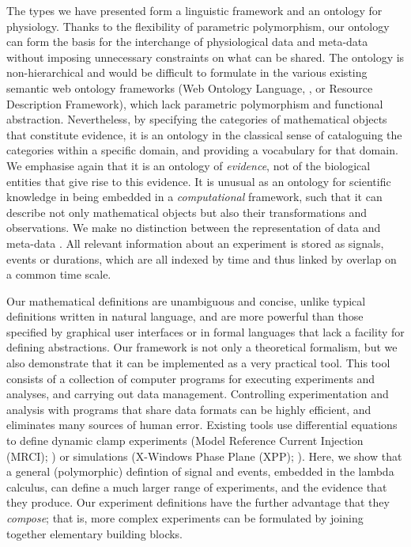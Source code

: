 \documentclass[11pt]{article}
\begin{document}
The types we have presented form a linguistic framework and an
ontology for physiology. Thanks to the flexibility of parametric
polymorphism, our ontology can form the basis for the interchange of
physiological data and meta-data without imposing unnecessary
constraints on what can be shared. The ontology is non-hierarchical
and would be difficult to formulate in the various existing semantic
web ontology frameworks (Web Ontology Language, \citep{owlref}, or
Resource Description Framework), which lack parametric polymorphism
and functional abstraction. Nevertheless, by specifying the categories
of mathematical objects that constitute evidence, it is an ontology in
the classical sense of cataloguing the categories within a specific
domain, and providing a vocabulary for that domain. We emphasise again
that it is an ontology of \emph{evidence}, not of the biological
entities that give rise to this evidence. It is unusual as an ontology
for scientific knowledge in being embedded in a \emph{computational}
framework, such that it can describe not only mathematical objects but
also their transformations and observations. We make no distinction between
the representation of data and meta-data \citep{Bower2009,
  Gibson2008}. All relevant information about an experiment is stored
as signals, events or durations, which are all indexed by time and
thus linked by overlap on a common time scale.

%
% 
%
Our mathematical definitions are unambiguous and concise, unlike
typical definitions written in natural language, and are more powerful
than those specified by graphical user interfaces or in formal
languages that lack a facility for defining abstractions. Our
framework is not only a theoretical formalism, but we also demonstrate
that it can be implemented as a very practical tool. This tool
consists of a collection of computer programs for executing
experiments and analyses, and carrying out data
management. Controlling experimentation and analysis with programs
that share data formats can be highly efficient, and eliminates many
sources of human error. Existing tools use differential equations to
define dynamic clamp experiments (Model Reference Current Injection
(MRCI); \citep{Raikov2004}) or simulations (X-Windows Phase Plane
(XPP); \citep{Ermentrout1987}). Here, we show that a general (polymorphic)
defintion of signal and events, embedded in the lambda calculus, can
define a much larger range of experiments, and the evidence that they
produce. Our experiment definitions have the further advantage that
they \emph{compose}; that is, more complex experiments can be
formulated by joining together elementary building blocks.
\end{document}
